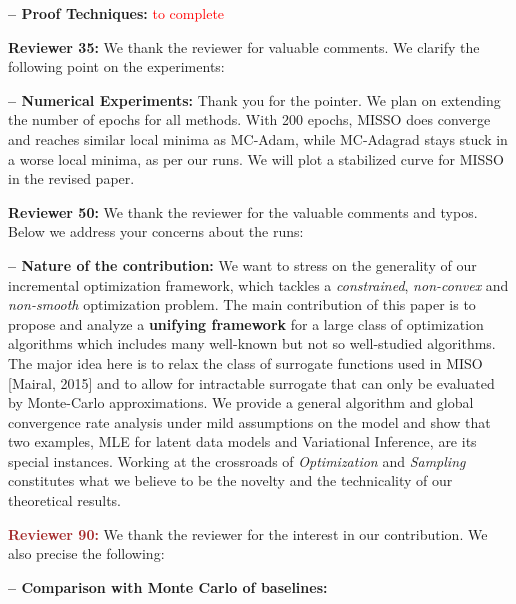 \documentclass{article}
\begin{document}
\textbf{-- Proof Techniques:} 
\textcolor{red}{to complete}

\medskip
\textbf{\textcolor{yellow!50!black}{Reviewer 35:}} We thank the reviewer for valuable comments. We clarify the following point on the experiments: 

\textbf{-- Numerical Experiments:} 
Thank you for the pointer.
We plan on extending the number of epochs for all methods.
With 200 epochs, MISSO does converge and reaches similar local minima as MC-Adam, while MC-Adagrad stays stuck in a worse local minima, as per our runs.
We will plot a stabilized curve for MISSO in the revised paper.


\medskip
\textbf{\textcolor{green!50!black}{Reviewer 50:}} We thank the reviewer for the valuable comments and typos. Below we address your concerns about the runs: 


\textbf{-- Nature of the contribution:} 
We want to stress on the generality of our incremental optimization framework, which tackles a \emph{constrained}, \emph{non-convex} and \emph{non-smooth} optimization problem. 
The main contribution of this paper is to propose and analyze a \textbf{unifying framework} for a large class of optimization algorithms which includes many well-known but not so well-studied algorithms.
The major idea here is to relax the class of surrogate functions used in MISO [Mairal, 2015] and to allow for intractable surrogate that can only be evaluated by Monte-Carlo approximations.
We provide a general algorithm and global convergence rate analysis under mild assumptions on the model and show that two examples, MLE for latent data models and Variational Inference, are its special instances.
Working at the crossroads of \emph{Optimization} and \emph{Sampling} constitutes what we believe to be the novelty and the technicality of our theoretical results.


\medskip
\textbf{\textcolor{brown}{Reviewer 90:}} We thank the reviewer for the interest in our contribution. We also precise the following: 

\textbf{-- Comparison with Monte Carlo of baselines:}
\end{document}

